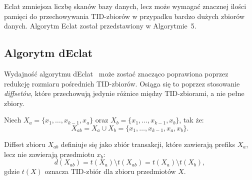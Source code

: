 \begin{algorithm}[!htb]
\LinesNumbered
{}

\BlankLine


\caption{\textbf{dEclat} algorytm (diffset-based Eclat)}
\label{alg:declat}
\end{algorithm}




Eclat zmniejsza liczbę skanów bazy danych, lecz może wymagać znacznej ilości pamięci do przechowywania TID-zbiorów w przypadku bardzo dużych zbiorów danych. Algorytm Eclat został przedstawiony w Algorytmie~5.


\subsection{Algorytm dEclat}
Wydajność algorytmu dEclat~\cite{zaki2003dECLAT} może zostać znacząco poprawiona poprzez redukcję rozmiaru pośrednich TID-zbiorów. Osiąga się to poprzez stosowanie \emph{diffsetów}, które przechowują jedynie różnice między TID-zbiorami, a nie pełne zbiory.

Niech $X_a = \{x_1, \ldots, x_{k-1}, x_a\}$ oraz
$X_b = \{x_1, \ldots, x_{k-1}, x_b\}$, tak że:
\begin{equation}
X_{ab} = X_a \cup X_b = \{x_1, \ldots, x_{k-1}, x_a, x_b\}.
\end{equation}

Diffset zbioru $X_{ab}$ definiuje się jako zbiór transakcji, które zawierają prefiks $X_a$, lecz nie zawierają przedmiotu $x_b$:
\begin{equation}
d(X_{ab}) = t(X_a) \setminus t(X_{ab}) = t(X_a) \setminus t(X_b),
\end{equation}
gdzie $t(X)$ oznacza TID-zbiór dla zbioru przedmiotów $X$.

